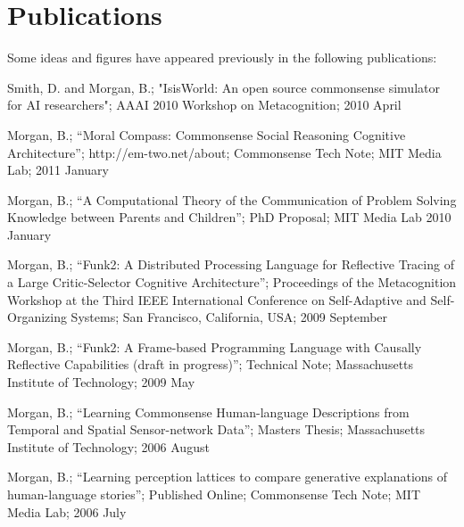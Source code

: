 \chapter*{Publications}
Some ideas and figures have appeared previously in the following publications:

\bigskip

\noindent Smith, D. and Morgan, B.; "IsisWorld: An open source
 commonsense simulator for AI researchers"; AAAI 2010 Workshop on
 Metacognition; 2010 April

\vspace{5mm}

\noindent Morgan, B.; ``Moral Compass: Commonsense Social Reasoning
 Cognitive Architecture''; http://em-two.net/about; Commonsense Tech
 Note; MIT Media Lab; 2011 January

\vspace{5mm}

\noindent Morgan, B.; ``A Computational Theory of the Communication of
 Problem Solving Knowledge between Parents and Children''; PhD
 Proposal; MIT Media Lab 2010 January

\vspace{5mm}

\noindent Morgan, B.; ``Funk2: A Distributed Processing Language for 
 Reflective Tracing of a Large Critic-Selector Cognitive
 Architecture''; Proceedings of the Metacognition Workshop at the
 Third IEEE International Conference on Self-Adaptive and
 Self-Organizing Systems; San Francisco, California, USA; 2009
 September

\vspace{5mm}

\noindent Morgan, B.; ``Funk2: A Frame-based Programming Language with
 Causally Reflective Capabilities (draft in progress)''; Technical
 Note; Massachusetts Institute of Technology; 2009 May

\vspace{5mm}

\noindent Morgan, B.; ``Learning Commonsense Human-language Descriptions
 from Temporal and Spatial Sensor-network Data''; Masters Thesis;
 Massachusetts Institute of Technology; 2006 August

\vspace{5mm}

\noindent Morgan, B.; ``Learning perception lattices to compare
 generative explanations of human-language stories''; Published
 Online; Commonsense Tech Note; MIT Media Lab; 2006 July

